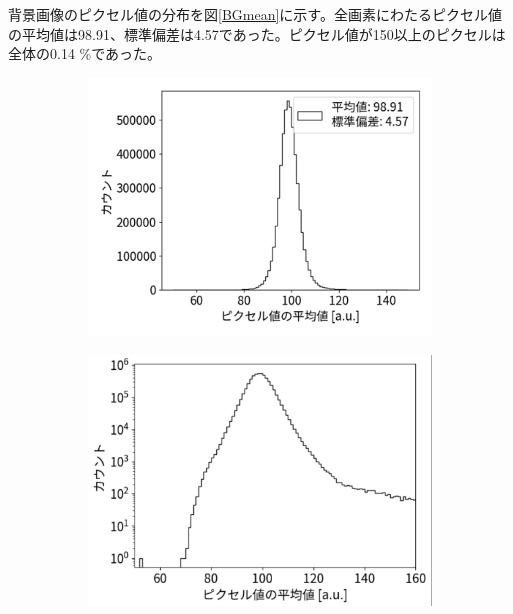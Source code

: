 \documentclass[a4paper,11pt,uplatex]{jsbook}
\begin{document}
背景画像のピクセル値の分布を図\ref{BGmean}に示す。全画素にわたるピクセル値の平均値は98.91、標準偏差は4.57であった。ピクセル値が150以上のピクセルは全体の0.14 \%であった。
\begin{figure}[H]
  \centering
  \begin{subfigure}[b]{0.45\linewidth}
    \centering
    \includegraphics[width=\linewidth]{image/4-BGmean.png}
  \end{subfigure}
  \hfill
  \begin{subfigure}[b]{0.45\linewidth}
    \centering
    \includegraphics[width=\linewidth]{image/4-BGmeanlog.png}
  \end{subfigure}

\end{figure}
\end{document}
